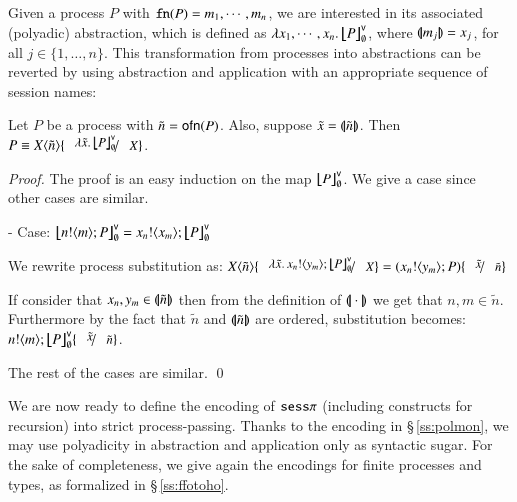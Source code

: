 Given a process $P$ with $\mathtt{fn}(P) = m_1, \cdots, m_n$, we are interested in its associated (polyadic) abstraction, which is defined as
$\lambda x_1, \cdots, x_n.\,\big\lfloor\!\!\big\lfloor P\big\rfloor\!\!\big\rfloor^\mathsf{v}_\emptyset$, where $(\!|\!|m_j|\!|\!) = x_j$, for all $j \in \{1, \ldots, n\}$.
This transformation from processes into abstractions can be reverted by
using abstraction and application with an appropriate sequence of session names:
%
\begin{proposition}\rm
	Let $P$ be a \HOp process with $\tilde{n} = \mathsf{ofn}(P)$.
	Also, suppose $\tilde{x} = (\!|\!|\tilde{n}|\!|\!)$.
	Then $P \scong \appl{X}{\tilde{n}}\subst{\abs{\tilde{x}}\auxmapp{P}{\mathsf{v}}{\emptyset}}{X}$.
\end{proposition}

\begin{proof}
	The proof is an easy induction on the map $\big\lfloor\!\!\big\lfloor P\big\rfloor\!\!\big\rfloor^\mathsf{v}_\emptyset$.
	We give a case since other cases are similar.

	\noi - Case: $\auxmapp{\bout{n}{m} P}{\mathsf{v}}{\es} = \bout{x_n}{x_m} \auxmapp{P}{\mathsf{v}}{\es}$

	\noi We rewrite process substitution as:
	$\appl{X}{\tilde{n}} \subst{\abs{\tilde{x}}{\bout{x_n}{y_m} \auxmapp{P}{\mathsf{v}}{\es}}}{X} = (\bout{x_n}{y_m} P) \subst{\tilde{x}}{\tilde{n}}$

	\noi If consider that $x_n, y_m \in (\!|\!|\tilde{n}|\!|\!)$ then from the definition of $(\!|\!|\cdot|\!|\!)$ we
	get that $n, m \in \tilde{n}$. Furthermore by the fact that $\tilde{n}$ and $(\!|\!|\tilde{n}|\!|\!)$ are
	ordered, substitution becomes:
	$\bout{n}{m} \auxmapp{P}{\mathsf{v}}{\es} \subst{\tilde{x}}{\tilde{n}}$.

	\noi The rest of the cases are similar.
	\qed
\end{proof}

We are now ready to define the encoding of $\mathtt{sess}\pi$
(including constructs for recursion) into strict process-passing.
Thanks to the encoding in \S\,\ref{ss:polmon}, we may use polyadicity in abstraction and application only
as syntactic sugar.
For the sake of completeness, we give again the encodings for 
finite processes and types, as
formalized 
in \S\,\ref{ss:ffotoho}.

